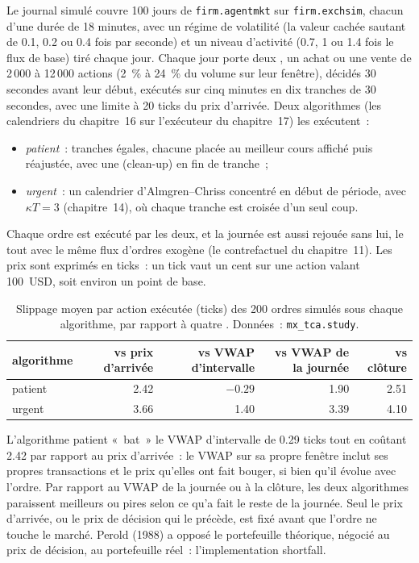 Le journal simulé couvre 100 jours de \texttt{firm.agentmkt} sur \texttt{firm.exchsim}, chacun d'une durée de 18 minutes, avec un régime de volatilité (la valeur cachée
sautant de 0.1, 0.2 ou 0.4 fois par seconde) et un niveau d'activité (0.7, 1 ou 1.4 fois le flux de base) tiré chaque jour. Chaque jour porte deux ,
un achat ou une vente de 2\,000 à 12\,000 actions (2~\% à 24~\% du volume sur leur fenêtre), décidés 30 secondes avant leur début, exécutés sur cinq minutes
en dix tranches de 30 secondes, avec une limite à 20 ticks du prix d'arrivée. Deux algorithmes (les calendriers du chapitre~16 sur l'exécuteur du chapitre~17) les exécutent~:
\begin{itemize}
\item \emph{patient}~: tranches égales, chacune placée au meilleur cours affiché puis réajustée, avec une  (clean-up) en fin de tranche~;
\item \emph{urgent}~: un calendrier d'Almgren--Chriss concentré en début de période, avec $\kappa T=3$ (chapitre~14), où chaque tranche est croisée d'un seul coup.
\end{itemize}
Chaque ordre est exécuté par les deux, et la journée est aussi rejouée sans lui, le tout avec le même flux d'ordres exogène (le contrefactuel du chapitre~11). Les prix sont
exprimés en ticks~: un tick vaut un cent sur une action valant 100~USD, soit environ un point de base.

\begin{table}[ht]
\centering
\small
\begin{tabular}{@{}lrrrr@{}}
\toprule
algorithme & vs prix d'arrivée & vs VWAP d'intervalle & vs VWAP de la journée & vs clôture \\
\midrule
patient & 2.42 & $-0.29$ & 1.90 & 2.51 \\
urgent & 3.66 & 1.40 & 3.39 & 4.10 \\
\bottomrule
\end{tabular}
\caption{Slippage moyen par action exécutée (ticks) des 200 ordres simulés sous chaque algorithme, par rapport à quatre . Données~:
\texttt{mx\_tca.study}.}\label{tab:mx:transaction-cost-analysis:benchmarks}
\end{table}

L'algorithme patient «~bat~» le VWAP d'intervalle de 0.29 ticks tout en coûtant 2.42 par rapport au prix d'arrivée~: le VWAP sur sa propre fenêtre inclut ses
propres transactions et le prix qu'elles ont fait bouger, si bien qu'il évolue avec l'ordre. Par rapport au VWAP de la journée ou à la clôture, les deux algorithmes paraissent meilleurs ou pires selon
ce qu'a fait le reste de la journée. Seul le prix d'arrivée, ou le prix de décision qui le précède, est fixé avant que l'ordre ne touche le marché. Perold (1988)
a opposé le portefeuille théorique, négocié au prix de décision, au portefeuille réel~: l'implementation shortfall.

